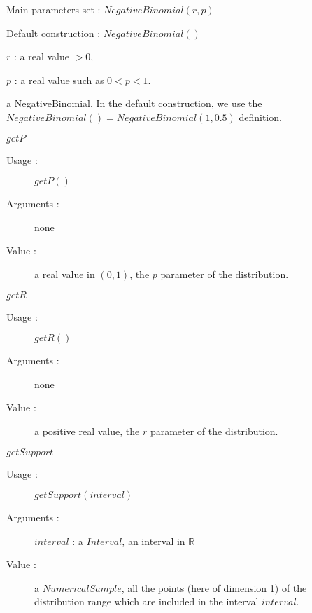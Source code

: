 \begin{description}

\item[Usage :]\rule{0pt}{1em}
  \begin{description}
  \item Main parameters set : $NegativeBinomial(r,p)$
  \item Default construction : $NegativeBinomial()$
  \end{description}

\item[Arguments :]  \rule{0pt}{1em}
  \begin{description}
  \item $r$ : a real value $>0$,
  \item  $p$ : a real value such as $0 < p < 1$.
  \end{description}

\item[Value :] a NegativeBinomial. In the default construction, we use the $NegativeBinomial() = NegativeBinomial(1,0.5)$ definition.

\item[Some methods :] \rule{0pt}{1em}
  \begin{description}

  \item $getP$
    \begin{description}
    \item[Usage :] $getP()$
    \item[Arguments :] none
    \item[Value :]  a real value in $(0, 1)$, the $p$ parameter of the distribution.
    \end{description}
    \bigskip

  \item $getR$
    \begin{description}
    \item[Usage :] $getR()$
    \item[Arguments :] none
    \item[Value :]  a positive real value, the $r$ parameter of the distribution.
    \end{description}
    \bigskip

  \item $getSupport$
    \begin{description}
    \item[Usage :] $getSupport(interval)$
    \item[Arguments :] $interval$ : a $Interval$, an interval in $\mathbb{R}$
    \item[Value :]  a $NumericalSample$, all the points (here of dimension 1) of the distribution range which are included in the interval $interval$.
    \end{description}


\end{description}
\end{description}
